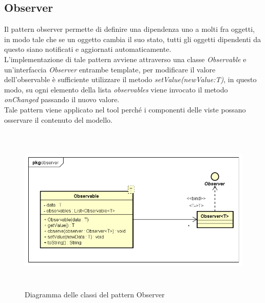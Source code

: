 \subsection{Observer}\label{subsec:observer}
Il pattern observer permette di definire una dipendenza uno a molti fra oggetti, in modo tale che se un oggetto cambia il suo stato, tutti gli oggetti dipendenti da questo siano notificati e aggiornati automaticamente.\\
L'implementazione di tale pattern avviene attraverso una classe \textit{Observable} e un'interfaccia \textit{Observer} entrambe template, per modificare il valore dell'observable è sufficiente utilizzare il metodo \textit{setValue(newValue:T)}, in questo modo, su ogni elemento della lista \textit{observables} viene invocato il metodo \textit{onChanged} passando il nuovo valore.\\
Tale pattern viene applicato nel tool perché i componenti delle viste possano osservare il contenuto del modello.
\begin{figure}[H]
    \centering
    \includegraphics[width=13cm, height=8cm]{./immagini/diagrammi_uml/Observer.png}
    \caption{Diagramma delle classi del pattern Observer}\label{fig:observer}
\end{figure}

\newpage
